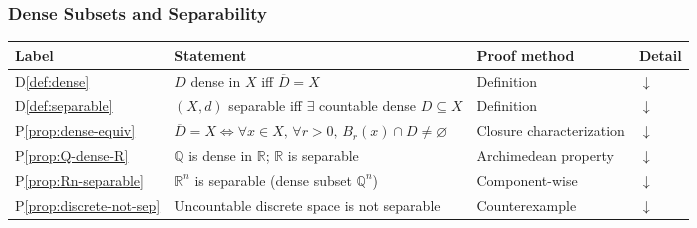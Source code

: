 %

\subsubsection{Dense Subsets and Separability}
\label{sec:dense-separable}

\begin{tcolorbox}[colback=gray!6, colframe=gray!40, arc=2pt,
  left=6pt, right=6pt, top=4pt, bottom=4pt,
  title={\small\textbf{Dense Subsets and Separability --- Quick Reference}},
  fonttitle=\small\bfseries]
\small
\begin{tabular}{l l l l}
\toprule
\textbf{Label} & \textbf{Statement} & \textbf{Proof method} & \textbf{Detail} \\
\midrule
D\ref{def:dense}
  & $D$ dense in $X$ iff $\overline{D} = X$
  & Definition
  & \hyperref[def:dense]{$\downarrow$} \\[4pt]
D\ref{def:separable}
  & $(X,d)$ separable iff $\exists$ countable dense $D \subseteq X$
  & Definition
  & \hyperref[def:separable]{$\downarrow$} \\[4pt]
P\ref{prop:dense-equiv}
  & $\overline{D}=X \iff \forall x \in X,\, \forall r>0,\, B_r(x)\cap D \neq \varnothing$
  & Closure characterization
  & \hyperref[prop:dense-equiv]{$\downarrow$} \\[4pt]
P\ref{prop:Q-dense-R}
  & $\mathbb{Q}$ is dense in $\mathbb{R}$; $\mathbb{R}$ is separable
  & Archimedean property
  & \hyperref[prop:Q-dense-R]{$\downarrow$} \\[4pt]
P\ref{prop:Rn-separable}
  & $\mathbb{R}^n$ is separable (dense subset $\mathbb{Q}^n$)
  & Component-wise
  & \hyperref[prop:Rn-separable]{$\downarrow$} \\[4pt]
P\ref{prop:discrete-not-sep}
  & Uncountable discrete space is not separable
  & Counterexample
  & \hyperref[prop:discrete-not-sep]{$\downarrow$} \\[4pt]
\bottomrule
\end{tabular}
\end{tcolorbox}


